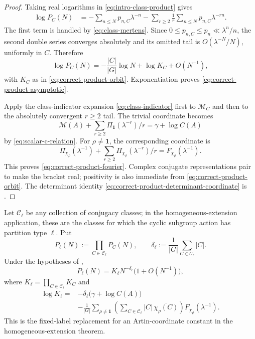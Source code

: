 \begin{proof}
Taking real logarithms in \eqref{eq:intro-class-product} gives
\begin{align}
  \log P_C(N)
  &=-\sum_{n\leq N}p_{n,C}\lambda^{-n}
    -\sum_{r\geq2}\frac1r
       \sum_{n\leq N}p_{n,C}\lambda^{-rn}.
       \label{eq:product-log-split}
\end{align}
The first term is handled by \eqref{eq:class-mertens}.  Since
\(0\leq p_{n,C}\leq p_n\ll\lambda^n/n\), the second double series converges
absolutely and its omitted tail is \(O(\lambda^{-N}/N)\), uniformly in
\(C\).  Therefore
\[
  \log P_C(N)=-\frac{|C|}{|G|}\log N+\log K_C+O(N^{-1}),
\]
with \(K_C\) as in \eqref{eq:correct-product-orbit}.  Exponentiation proves
\eqref{eq:correct-product-asymptotic}.

Apply the class-indicator expansion \eqref{eq:class-indicator} first to
\(\mathcal M_C\) and then to the absolutely convergent \(r\geq2\) tail.
The trivial coordinate becomes
\[
 \mathcal M(A)+\sum_{r\geq2}\Pi_{\mathbf1}(\lambda^{-r})/r
 =\gamma+\log C(A)
\]
by \eqref{eq:scalar-c-relation}.  For \(\rho\neq\mathbf1\), the corresponding
coordinate is
\[
 \Pi_{\chi_\rho}(\lambda^{-1})+
 \sum_{r\geq2}\Pi_{\chi_\rho}(\lambda^{-r})/r
 =F_{\chi_\rho}(\lambda^{-1}).
\]
This proves \eqref{eq:correct-product-fourier}.  Complex conjugate
representations pair to make the bracket real; positivity is also immediate
from \eqref{eq:correct-product-orbit}.  The determinant identity
\eqref{eq:correct-product-determinant-coordinate} is
.
\end{proof}

\begin{corollary}
\label{cor:homogeneous-union-constant}
Let \(\mathcal C_\ell\) be any collection of conjugacy classes; in the
homogeneous-extension application, these are the classes for which the cyclic
subgroup action has partition type \(\ell\).  Put
\[
 P_\ell(N):=\prod_{C\in\mathcal C_\ell}P_C(N),
 \qquad
 \delta_\ell:=\frac1{|G|}\sum_{C\in\mathcal C_\ell}|C|.
\]
Under the hypotheses of ,
\begin{equation}\label{eq:homogeneous-union-product}
 P_\ell(N)=K_\ell N^{-\delta_\ell}\bigl(1+O(N^{-1})\bigr),
\end{equation}
where \(K_\ell=\prod_{C\in\mathcal C_\ell}K_C\) and
\begin{equation}\label{eq:homogeneous-union-constant}
 \begin{split}
 \log K_\ell={}&-\delta_\ell\bigl(\gamma+\log C(A)\bigr)\\
 &-\frac1{|G|}\sum_{\rho\ne\mathbf1}
   \left(\sum_{C\in\mathcal C_\ell}
       |C|\,\overline{\chi_\rho(C)}\right)
       F_{\chi_\rho}(\lambda^{-1}).
 \end{split}
\end{equation}
This is the fixed-label replacement for an Artin-coordinate constant in the
homogeneous-extension theorem.
\end{corollary}

